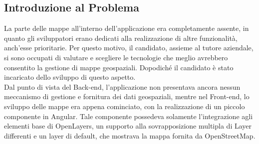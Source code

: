 \subsection{Introduzione al Problema}

La parte delle mappe all'interno dell'applicazione era completamente assente, in quanto gli sviluppatori erano dedicati alla realizzazione di altre funzionalità, anch'esse prioritarie. Per questo motivo, il candidato, assieme al tutore aziendale, si sono occupati di valutare e scegliere le tecnologie che meglio avrebbero consentito la gestione di mappe geospaziali. Dopodiché il candidato è stato incaricato dello sviluppo di questo aspetto.
\\Dal punto di vista del Back-end, l'applicazione non presentava ancora nessun meccanismo di gestione e fornitura dei dati geospaziali, mentre nel Front-end, lo sviluppo delle mappe era appena cominciato, con la realizzazione di un piccolo componente in Angular. Tale componente possedeva solamente l'integrazione agli elementi base di OpenLayers, un supporto alla sovrapposizione multipla di Layer differenti e un layer di default, che mostrava la mappa fornita da OpenStreetMap.









